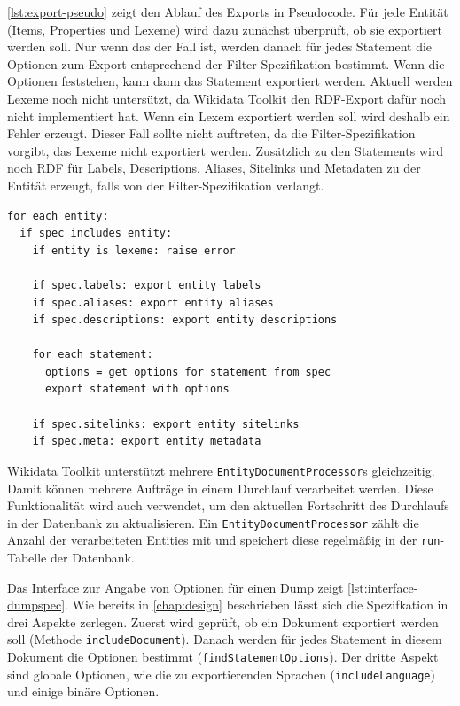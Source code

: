 \cref{lst:export-pseudo} zeigt den Ablauf des Exports in Pseudocode.
Für jede Entität (Items, Properties und Lexeme) wird dazu zunächst überprüft, ob sie exportiert werden soll.
Nur wenn das der Fall ist, werden danach für jedes Statement die Optionen zum Export entsprechend der Filter-Spezifikation bestimmt. 
Wenn die Optionen feststehen, kann dann das Statement exportiert werden.
Aktuell werden Lexeme noch nicht untersützt, da Wikidata Toolkit den RDF-Export dafür noch nicht implementiert hat.
Wenn ein Lexem exportiert werden soll wird deshalb ein Fehler erzeugt.
Dieser Fall sollte nicht auftreten, da die Filter-Spezifikation vorgibt, das Lexeme nicht exportiert werden.
Zusätzlich zu den Statements wird noch RDF für Labels, Descriptions, Aliases, Sitelinks und Metadaten zu der Entität erzeugt, falls von der Filter-Spezifikation verlangt.

\begin{lstlisting}[keywords={for,each,if,let}, caption={Pseudocode für Entity-Export}, label={lst:export-pseudo}]
for each entity:
  if spec includes entity:
    if entity is lexeme: raise error
  
    if spec.labels: export entity labels
    if spec.aliases: export entity aliases
    if spec.descriptions: export entity descriptions

    for each statement:
      options = get options for statement from spec
      export statement with options

    if spec.sitelinks: export entity sitelinks
    if spec.meta: export entity metadata
\end{lstlisting}

Wikidata Toolkit unterstützt mehrere \verb|EntityDocumentProcessor|s gleichzeitig.
Damit können mehrere Aufträge in einem Durchlauf verarbeitet werden. 
Diese Funktionalität wird auch verwendet, um den aktuellen Fortschritt des Durchlaufs in der Datenbank zu aktualisieren.
Ein \verb|EntityDocumentProcessor| zählt die Anzahl der verarbeiteten Entities mit und speichert diese regelmäßig in der \verb|run|-Tabelle der Datenbank.

Das Interface zur Angabe von Optionen für einen Dump zeigt \cref{lst:interface-dumpspec}.
Wie bereits in \cref{chap:design} beschrieben lässt sich die Spezifkation in drei Aspekte zerlegen.
Zuerst wird geprüft, ob ein Dokument exportiert werden soll (Methode \verb|includeDocument|).
Danach werden für jedes Statement in diesem Dokument die Optionen bestimmt (\verb|findStatementOptions|).
Der dritte Aspekt sind globale Optionen, wie die zu exportierenden Sprachen (\verb|includeLanguage|) und einige binäre Optionen.

